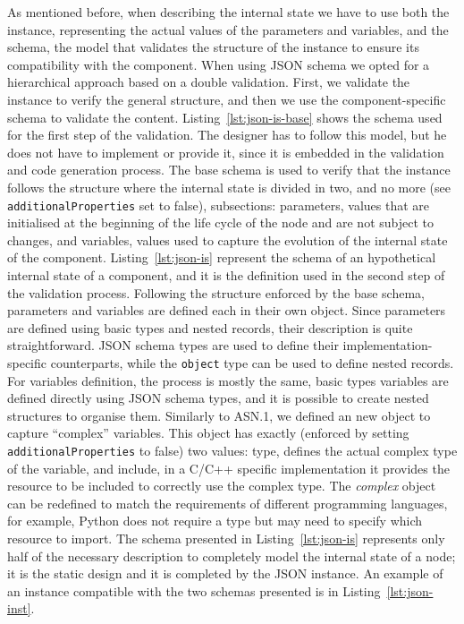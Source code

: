 As mentioned before, when describing the internal state we have to use both the instance, representing the actual values of the parameters and variables, and the schema, the model that validates the structure of the instance to ensure its compatibility with the component. When using JSON schema we opted for a hierarchical approach based on a double validation. First, we validate the instance to verify the general structure, and then we use the component-specific schema to validate the content. Listing~\ref{lst:json-is-base} shows the schema used for the first step of the validation. The designer has to follow this model, but he does not have to implement or provide it, since it is embedded in the validation and code generation process. The base schema is used to verify that the instance follows the structure where the internal state is divided in two, and no more (see \texttt{additionalProperties} set to false), subsections: parameters, values that are initialised at the beginning of the life cycle of the node and are not subject to changes, and variables, values used to capture the evolution of the internal state of the component. Listing~\ref{lst:json-is} represent the schema of an hypothetical internal state of a component, and it is the definition used in the second step of the validation process. Following the structure enforced by the base schema, parameters and variables are defined each in their own object. Since parameters are defined using basic types and nested records, their description is quite straightforward. JSON schema types are used to define their implementation-specific counterparts, while the \texttt{object} type can be used to define nested records. For variables definition, the process is mostly the same, basic types variables are defined directly using JSON schema types, and it is possible to create nested structures to organise them. Similarly to ASN.1, we defined an new object to capture ``complex'' variables. This object has exactly (enforced by setting \texttt{additionalProperties} to false) two values: type, defines the actual complex type of the variable, and include, in a C/C++ specific implementation it provides the resource to be included to correctly use the complex type. The \textit{complex} object can be redefined to match the requirements of different programming languages, for example, Python does not require a type but may need to specify which resource to import. The schema presented in Listing~\ref{lst:json-is} represents only half of the necessary description to completely model the internal state of a node; it is the static design and it is completed by the JSON instance. An example of an instance compatible with the two schemas presented is in Listing~\ref{lst:json-inst}. 

